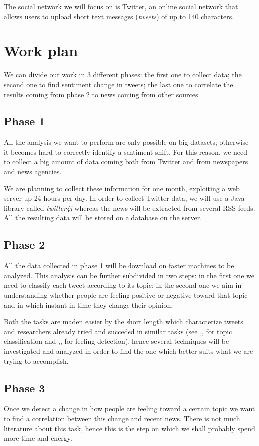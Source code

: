 \documentclass[a4paper]{article}
\begin{document}
The social network we will focus on is Twitter, an online social network that
allows users to upload short text messages (\emph{tweets}) of up to 140 characters.

\section{Work plan}
We can divide our work in 3 different phases: the first one to collect data; the
second one to find sentiment change in tweets; the last one to correlate the
results coming from phase 2 to news coming from other sources.

\subsection{Phase 1}
All the analysis we want to perform are only possible on big datasets; otherwise
it becomes hard to correctly identify a sentiment shift. For this reason, we
need to collect a big amount of data coming both from Twitter and from
newspapers and news agencies. 

We are planning to collect these information for one month, exploiting a web
server up 24 hours per day. In order to collect Twitter data, we will use a Java
library called \emph{twitter4j} whereas the news will be extracted from several
RSS feeds. All the resulting data will be stored on a database on the server.

\subsection{Phase 2}
All the data collected in phase 1 will be download on faster machines to be
analyzed. This analysis can be further subdivided in two steps: in the first one
we need to classify each tweet according to its topic; in the second one we aim
in understanding whether people are feeling positive or negative toward that
topic and in which instant in time they change their opinion.

Both the tasks are maden easier by the short length which characterize tweets
and researchers already tried and succeded in similar tasks (see
		\cite{Wang},\cite{Sriram},\cite{Lee} for topic classification and
		\cite{Bifet},\cite{Go},\cite{Palpanas} for feeling detection), hence
several techniques will be investigated and analyzed in order to find the one
which better suits what we are trying to accomplish.

\subsection{Phase 3}
Once we detect a change in how people are feeling toward a certain topic we want
to find a correlation between this change and recent news. There is not much
literature about this task, hence this is the step on which we shall
probably spend more time and energy.
\end{document}
